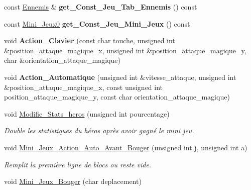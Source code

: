 \begin{DoxyCompactItemize}
\item 
\hypertarget{classJeu_a1e420cba405c854a8392036bd75d751d}{const \hyperlink{classEnnemis}{Ennemis} \& {\bfseries get\+\_\+\+Const\+\_\+\+Jeu\+\_\+\+Tab\+\_\+\+Ennemis} () const }\label{classJeu_a1e420cba405c854a8392036bd75d751d}

\item 
\hypertarget{classJeu_adc630706f795ba4b9e3f34e6a022ec28}{const \hyperlink{classMini__Jeux0}{Mini\+\_\+\+Jeux0} {\bfseries get\+\_\+\+Const\+\_\+\+Jeu\+\_\+\+Mini\+\_\+\+Jeux} () const }\label{classJeu_adc630706f795ba4b9e3f34e6a022ec28}

\item 
\hypertarget{classJeu_ad83d41f74cedd43d21507698030a3cf4}{void {\bfseries Action\+\_\+\+Clavier} (const char touche, unsigned int \&position\+\_\+attaque\+\_\+magique\+\_\+x, unsigned int \&position\+\_\+attaque\+\_\+magique\+\_\+y, char \&orientation\+\_\+attaque\+\_\+magique)}\label{classJeu_ad83d41f74cedd43d21507698030a3cf4}

\item 
\hypertarget{classJeu_a55509208395374f443689dd04505b161}{void {\bfseries Action\+\_\+\+Automatique} (unsigned int \&vitesse\+\_\+attaque, unsigned int \&position\+\_\+attaque\+\_\+magique\+\_\+x, const unsigned int position\+\_\+attaque\+\_\+magique\+\_\+y, const char orientation\+\_\+attaque\+\_\+magique)}\label{classJeu_a55509208395374f443689dd04505b161}

\item 
\hypertarget{classJeu_ada702482e96105931c60b38ef7690755}{void \hyperlink{classJeu_ada702482e96105931c60b38ef7690755}{Modifie\+\_\+\+Stats\+\_\+heros} (unsigned int pourcentage)}\label{classJeu_ada702482e96105931c60b38ef7690755}

\begin{DoxyCompactList}\small\item\em Double les statistiques du héros après avoir gagné le mini jeu. \end{DoxyCompactList}\item 
\hypertarget{classJeu_ada6df09dbcf8f8d813606c16614e9f86}{void \hyperlink{classJeu_ada6df09dbcf8f8d813606c16614e9f86}{Mini\+\_\+\+Jeux\+\_\+\+Action\+\_\+\+Auto\+\_\+\+Avant\+\_\+\+Bouger} (unsigned int j, unsigned int a)}\label{classJeu_ada6df09dbcf8f8d813606c16614e9f86}

\begin{DoxyCompactList}\small\item\em Remplit la première ligne de blocs ou reste vide. \end{DoxyCompactList}\item 
\hypertarget{classJeu_a4813704613c198236c86c91c9ba9a859}{void \hyperlink{classJeu_a4813704613c198236c86c91c9ba9a859}{Mini\+\_\+\+Jeux\+\_\+\+Bouger} (char deplacement)}\label{classJeu_a4813704613c198236c86c91c9ba9a859}


\end{DoxyCompactItemize}
